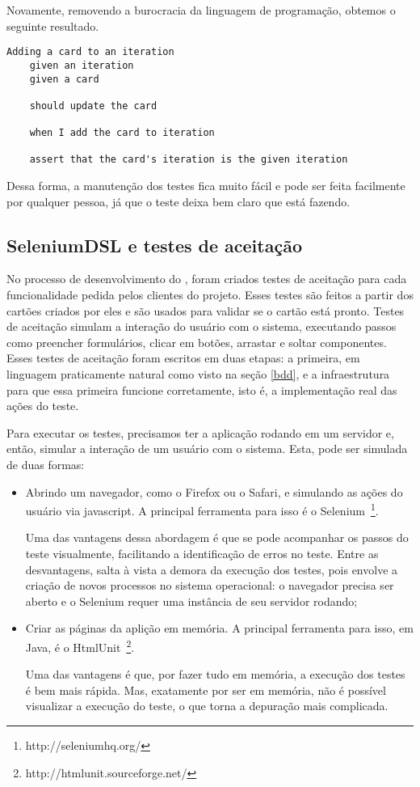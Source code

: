 Novamente, removendo a burocracia da linguagem de programação, obtemos o seguinte resultado.

\begin{verbatim}
Adding a card to an iteration
	given an iteration
	given a card

	should update the card

	when I add the card to iteration

	assert that the card's iteration is the given iteration
\end{verbatim}

Dessa forma, a manutenção dos testes fica muito fácil e pode ser feita facilmente por qualquer pessoa, já que o teste deixa bem claro que está fazendo.

\subsection{SeleniumDSL e testes de aceitação}

No processo de desenvolvimento do \calopsita{}, foram criados testes de aceitação para cada funcionalidade pedida pelos clientes do projeto. Esses testes são feitos a partir dos cartões criados por eles e são usados para validar se o cartão está pronto. Testes de aceitação simulam a interação do usuário com o sistema, executando passos como preencher formulários, clicar em botões, arrastar e soltar componentes. Esses testes de aceitação foram escritos em duas etapas: a primeira, em linguagem praticamente natural como visto na seção \ref{bdd}, e a infraestrutura para que essa primeira funcione corretamente, isto é, a implementação real das ações do teste.

Para executar os testes, precisamos ter a aplicação rodando em um servidor e, então, simular a interação de um usuário com o sistema. Esta, pode ser simulada de duas formas:

\begin{itemize}
	\item{Abrindo um navegador, como o Firefox ou o Safari, e simulando as ações do usuário via javascript. A principal	ferramenta para isso é o Selenium~\footnote{http://seleniumhq.org/}. 

Uma das vantagens dessa abordagem é que se pode acompanhar os passos do teste visualmente, facilitando a identificação de erros no teste. Entre as desvantagens, salta à vista a demora da execução dos testes, pois envolve a criação de novos processos no sistema operacional: o navegador precisa ser aberto e o Selenium requer uma instância de seu servidor rodando;}
	\item{Criar as páginas da aplição em memória. A principal ferramenta para isso, em Java, é o HtmlUnit~\footnote{http://htmlunit.sourceforge.net/}. 

Uma das vantagens é que, por fazer tudo em memória, a execução dos testes é bem mais rápida. Mas, exatamente por ser em memória, não é possível visualizar a execução do teste, o que torna a depuração mais complicada.}
\end{itemize}

